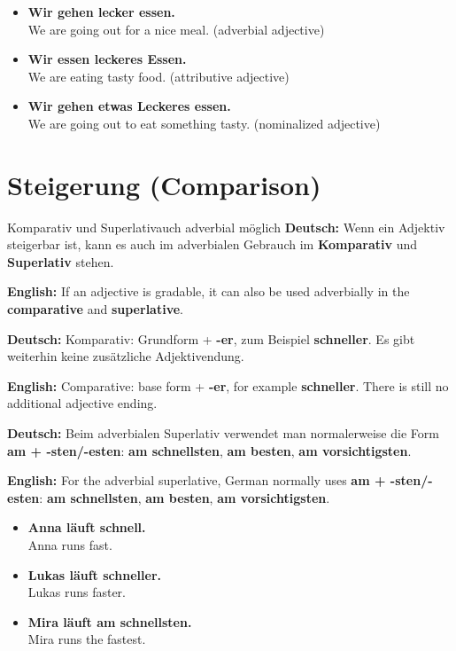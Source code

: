 \documentclass[a4paper,11pt]{article}
\newcommand{\GermanText}[1]{\textbf{Deutsch: }#1\par}
\newcommand{\EnglishText}[1]{{\small\color{SoftGray}\textbf{English: }#1\par}}
\newcommand{\ExampleItem}[2]{\item \textbf{#1}\\{\small\color{SoftGray}#2}}
\begin{document}
        \begin{exbox}
            \begin{itemize}
                \ExampleItem{Wir gehen lecker essen.}{We are going out for a nice meal. (adverbial adjective)}
                \ExampleItem{Wir essen leckeres Essen.}{We are eating tasty food. (attributive adjective)}
                \ExampleItem{Wir gehen etwas Leckeres essen.}{We are going out to eat something tasty. (nominalized adjective)}
            \end{itemize}
        \end{exbox}

\section{Steigerung \textnormal{(Comparison)}}

        \begin{grammarentry}{Komparativ und Superlativ}{auch adverbial möglich}
            \GermanText{Wenn ein Adjektiv steigerbar ist, kann es auch im adverbialen Gebrauch im \textbf{Komparativ} und \textbf{Superlativ} stehen.}
            \EnglishText{If an adjective is gradable, it can also be used adverbially in the \textbf{comparative} and \textbf{superlative}.}

            \GermanText{Komparativ: Grundform + \textbf{-er}, zum Beispiel \textbf{schneller}. Es gibt weiterhin keine zusätzliche Adjektivendung.}
            \EnglishText{Comparative: base form + \textbf{-er}, for example \textbf{schneller}. There is still no additional adjective ending.}

            \GermanText{Beim adverbialen Superlativ verwendet man normalerweise die Form \textbf{am + -sten/-esten}: \textbf{am schnellsten}, \textbf{am besten}, \textbf{am vorsichtigsten}.}
            \EnglishText{For the adverbial superlative, German normally uses \textbf{am + -sten/-esten}: \textbf{am schnellsten}, \textbf{am besten}, \textbf{am vorsichtigsten}.}
        \end{grammarentry}

        \begin{exbox}
            \begin{itemize}
                \ExampleItem{Anna läuft schnell.}{Anna runs fast.}
                \ExampleItem{Lukas läuft schneller.}{Lukas runs faster.}
                \ExampleItem{Mira läuft am schnellsten.}{Mira runs the fastest.}
            \end{itemize}
        \end{exbox}
\end{document}
